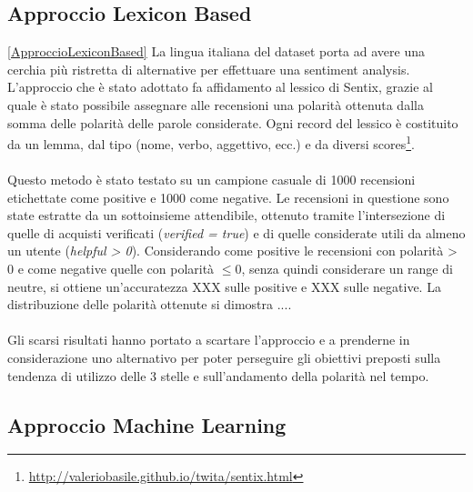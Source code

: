 \subsection{Approccio Lexicon Based}\ref{ApproccioLexiconBased}
La lingua italiana del dataset porta ad avere una cerchia più ristretta di alternative per effettuare una sentiment analysis. L'approccio che è stato adottato fa affidamento al lessico di Sentix, grazie al quale è stato possibile assegnare alle recensioni una polarità ottenuta dalla somma delle polarità delle parole considerate. Ogni record del lessico è costituito da un lemma, dal tipo (nome, verbo, aggettivo, ecc.) e da diversi scores\footnote{\url{http://valeriobasile.github.io/twita/sentix.html}}. 
\\\\
Questo metodo è stato testato su un campione casuale di 1000 recensioni etichettate come positive e 1000 come negative. Le recensioni in questione sono state estratte da un sottoinsieme attendibile, ottenuto tramite l'intersezione di quelle di acquisti verificati (\textit{verified = true}) e di quelle considerate utili da almeno un utente (\textit{helpful > 0}). Considerando come positive le recensioni con polarità > 0 e come negative quelle con polarità $\leq 0$, senza quindi considerare un range di neutre, si ottiene un'accuratezza XXX sulle positive e XXX sulle negative. 
La distribuzione delle polarità ottenute si dimostra .... 
\\\\
Gli scarsi risultati hanno portato a scartare l'approccio e a prenderne in considerazione uno alternativo per poter perseguire gli obiettivi preposti sulla tendenza di utilizzo delle 3 stelle e sull'andamento della polarità nel tempo.

\subsection{Approccio Machine Learning}\label{ApproccioMachineLearning}

